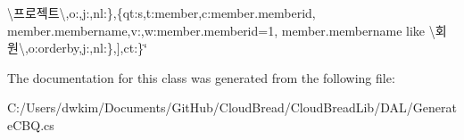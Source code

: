 \begin{DoxyCompactItemize}
\textbackslash{}\textquotesingle{}프로젝트\textbackslash{}\textquotesingle{}\textquotesingle{},\textquotesingle{}o\textquotesingle{}\+:\textquotesingle{}\textquotesingle{},\textquotesingle{}j\textquotesingle{}\+:\textquotesingle{}\textquotesingle{},\textquotesingle{}nl\textquotesingle{}\+:\textquotesingle{}\textquotesingle{}\},\{\textquotesingle{}qt\textquotesingle{}\+:\textquotesingle{}s\textquotesingle{},\textquotesingle{}t\textquotesingle{}\+:\textquotesingle{}member\textquotesingle{},\textquotesingle{}c\textquotesingle{}\+:\textquotesingle{}member.\+memberid, member.\+membername\textquotesingle{},\textquotesingle{}v\textquotesingle{}\+:\textquotesingle{}\textquotesingle{},\textquotesingle{}w\textquotesingle{}\+:\textquotesingle{}member.\+memberid=1, member.\+membername like \textbackslash{}\textquotesingle{}회원\textbackslash{}\textquotesingle{}\textquotesingle{},\textquotesingle{}o\textquotesingle{}\+:\textquotesingle{}orderby\textquotesingle{},\textquotesingle{}j\textquotesingle{}\+:\textquotesingle{}\textquotesingle{},\textquotesingle{}nl\textquotesingle{}\+:\textquotesingle{}\textquotesingle{}\},\mbox{]},\textquotesingle{}ct\textquotesingle{}\+:\textquotesingle{}\textquotesingle{}\}\char`\"{}\hypertarget{a00085_a91fcb156883a57b49b6766b1832f9d10}{}\label{a00085_a91fcb156883a57b49b6766b1832f9d10}

\end{DoxyCompactItemize}


The documentation for this class was generated from the following file\+:\begin{DoxyCompactItemize}
\item 
C\+:/\+Users/dwkim/\+Documents/\+Git\+Hub/\+Cloud\+Bread/\+Cloud\+Bread\+Lib/\+D\+A\+L/Generate\+C\+B\+Q.\+cs\end{DoxyCompactItemize}

